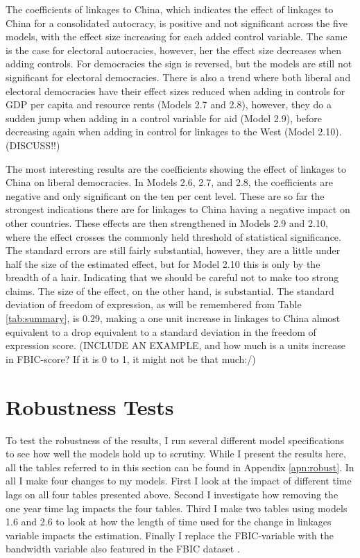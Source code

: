 The coefficients of linkages to China, which indicates the effect of linkages to China for a consolidated autocracy, is positive and not significant across the five models, with the effect size increasing for each added control variable. The same is the case for electoral autocracies, however, her the effect size decreases when adding controls. For democracies the sign is reversed, but the models are still not significant for electoral democracies. There is also a trend where both liberal and electoral democracies have their effect sizes reduced when adding in controls for GDP per capita and resource rents (Models 2.7 and 2.8), however, they do a sudden jump when adding in a control variable for aid (Model 2.9), before decreasing again when adding in control for linkages to the West (Model 2.10). (DISCUSS!!)

The most interesting results are the coefficients showing the effect of linkages to China on liberal democracies. In Models 2.6, 2.7, and 2.8, the coefficients are negative and only significant on the ten per cent level. These are so far the strongest indications there are for linkages to China having a negative impact on other countries. These effects are then strengthened in Models 2.9 and 2.10, where the effect crosses the commonly held threshold of statistical significance. The standard errors are still fairly substantial, however, they are a little under half the size of the estimated effect, but for Model 2.10 this is only by the breadth of a hair. Indicating that we should be careful not to make too strong claims. The size of the effect, on the other hand, is substantial. The standard deviation of freedom of expression, as will be remembered from Table \ref{tab:summary}, is 0.29, making a one unit increase in linkages to China almost equivalent to a drop equivalent to a standard deviation in the freedom of expression score. (INCLUDE AN EXAMPLE, and how much is a units increase in FBIC-score? If it is 0 to 1, it might not be that much:/)

\section{Robustness Tests} \label{sec:robust}
To test the robustness of the results, I run several different model specifications to see how well the models hold up to scrutiny. While I present the results here, all the tables referred to in this section can be found in Appendix \ref{apn:robust}. In all I make four changes to my models. First I look at the impact of different time lags on all four tables presented above. Second I investigate how removing the one year time lag impacts the four tables. Third I make two tables using models 1.6 and 2.6 to look at how the length of time used for the change in linkages variable impacts the estimation. Finally I replace the FBIC-variable with the bandwidth variable also featured in the FBIC dataset \citep{moyer_china-us_2021}.

